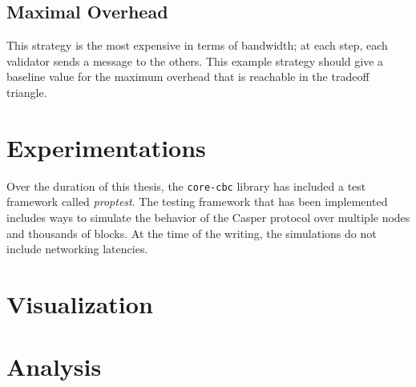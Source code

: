 \subsection{Maximal Overhead}
This strategy is the most expensive in terms of bandwidth; at each step, each
validator sends a message to the others. This example strategy should give a
baseline value for the maximum overhead that is reachable in the tradeoff
triangle.

\section{Experimentations}
Over the duration of this thesis, the \texttt{core-cbc} library has included a
test framework called \textit{proptest}. The testing framework that has been
implemented includes ways to simulate the behavior of the Casper protocol over
multiple nodes and thousands  of blocks. At the time of the
writing, the simulations do not include networking latencies.


\section{Visualization}

\section{Analysis}
